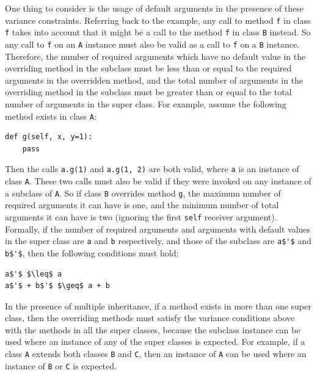 One thing to consider is the usage of default arguments in the presence of these variance constraints. Referring back to the example, any call to method \lstinline|f| in class \lstinline|f| takes into account that it might be a call to the method \lstinline|f| in class \lstinline|B| instead. So any call to \lstinline|f| on an \lstinline|A| instance must also be valid as a call to \lstinline|f| on a \lstinline|B| instance. Therefore, the number of required arguments which have no default value in the overriding method in the subclass must be less than or equal to the required arguments in the overridden method, and the total number of arguments in the overriding method in the subclass must be greater than or equal to the total number of arguments in the super class. For example, assume the following method exists in class \lstinline|A|:
\begin{lstlisting}
def g(self, x, y=1):
	pass
\end{lstlisting}

Then the calls \lstinline|a.g(1)| and \lstinline|a.g(1, 2)| are both valid, where \lstinline|a| is an instance of class \lstinline|A|. These two calls must also be valid if they were invoked on any instance of a subclass of \lstinline|A|. So if class \lstinline|B| overrides method \lstinline|g|, the maximum number of required arguments it can have is one, and the minimum number of total arguments it can have is two (ignoring the first \lstinline|self| receiver argument).\\

Formally, if the number of required arguments and arguments with default values in the super class are \lstinline|a| and \lstinline|b| respectively, and those of the subclass are \lstinline[mathescape]|a$'$| and \lstinline[mathescape]|b$'$|, then the following conditions must hold:
\begin{lstlisting}[mathescape]
a$'$ $\leq$ a 
a$'$ + b$'$ $\geq$ a + b
\end{lstlisting}

In the presence of multiple inheritance, if a method exists in more than one super class, then the overriding methods must satisfy the variance conditions above with the methods in all the super classes, because the subclass instance can be used where an instance of any of the super classes is expected. For example, if a class \lstinline|A| extends both classes \lstinline|B| and \lstinline|C|, then an instance of \lstinline|A| can be used where an instance of \lstinline|B| or \lstinline|C| is expected.

